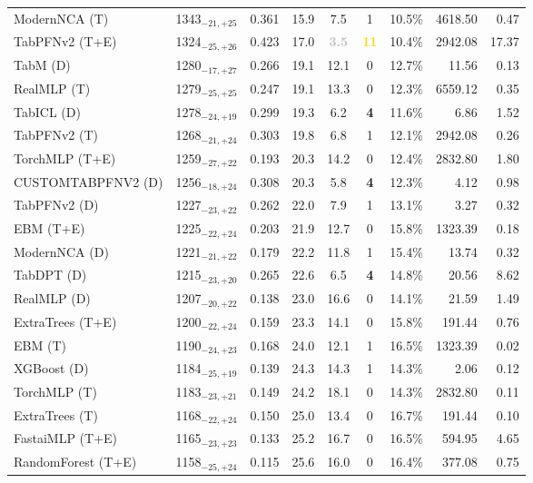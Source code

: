 \begin{tabular}{llcccccrr}
ModernNCA (T) & 1343${}_{-21,+25}$ & 0.361 & 15.9 & 7.5 & 1 & 10.5\% & 4618.50 & 0.47 \\
TabPFNv2 (T+E) & 1324${}_{-25,+26}$ & 0.423 & 17.0 & \textcolor{silver}{\textbf{3.5}} & \textcolor{gold}{\textbf{11}} & 10.4\% & 2942.08 & 17.37 \\
TabM (D) & 1280${}_{-17,+27}$ & 0.266 & 19.1 & 12.1 & 0 & 12.7\% & 11.56 & 0.13 \\
RealMLP (T) & 1279${}_{-25,+25}$ & 0.247 & 19.1 & 13.3 & 0 & 12.3\% & 6559.12 & 0.35 \\
TabICL (D) & 1278${}_{-24,+19}$ & 0.299 & 19.3 & 6.2 & \textcolor{bronze}{\textbf{4}} & 11.6\% & 6.86 & 1.52 \\
TabPFNv2 (T) & 1268${}_{-21,+24}$ & 0.303 & 19.8 & 6.8 & 1 & 12.1\% & 2942.08 & 0.26 \\
TorchMLP (T+E) & 1259${}_{-27,+22}$ & 0.193 & 20.3 & 14.2 & 0 & 12.4\% & 2832.80 & 1.80 \\
CUSTOMTABPFNV2 (D) & 1256${}_{-18,+24}$ & 0.308 & 20.3 & 5.8 & \textcolor{bronze}{\textbf{4}} & 12.3\% & 4.12 & 0.98 \\
TabPFNv2 (D) & 1227${}_{-23,+22}$ & 0.262 & 22.0 & 7.9 & 1 & 13.1\% & 3.27 & 0.32 \\
EBM (T+E) & 1225${}_{-22,+24}$ & 0.203 & 21.9 & 12.7 & 0 & 15.8\% & 1323.39 & 0.18 \\
ModernNCA (D) & 1221${}_{-21,+22}$ & 0.179 & 22.2 & 11.8 & 1 & 15.4\% & 13.74 & 0.32 \\
TabDPT (D) & 1215${}_{-23,+20}$ & 0.265 & 22.6 & 6.5 & \textcolor{bronze}{\textbf{4}} & 14.8\% & 20.56 & 8.62 \\
RealMLP (D) & 1207${}_{-20,+22}$ & 0.138 & 23.0 & 16.6 & 0 & 14.1\% & 21.59 & 1.49 \\
ExtraTrees (T+E) & 1200${}_{-22,+24}$ & 0.159 & 23.3 & 14.1 & 0 & 15.8\% & 191.44 & 0.76 \\
EBM (T) & 1190${}_{-24,+23}$ & 0.168 & 24.0 & 12.1 & 1 & 16.5\% & 1323.39 & 0.02 \\
XGBoost (D) & 1184${}_{-25,+19}$ & 0.139 & 24.3 & 14.3 & 1 & 14.3\% & 2.06 & 0.12 \\
TorchMLP (T) & 1183${}_{-23,+21}$ & 0.149 & 24.2 & 18.1 & 0 & 14.3\% & 2832.80 & 0.11 \\
ExtraTrees (T) & 1168${}_{-22,+24}$ & 0.150 & 25.0 & 13.4 & 0 & 16.7\% & 191.44 & 0.10 \\
FastaiMLP (T+E) & 1165${}_{-23,+23}$ & 0.133 & 25.2 & 16.7 & 0 & 16.5\% & 594.95 & 4.65 \\
RandomForest (T+E) & 1158${}_{-25,+24}$ & 0.115 & 25.6 & 16.0 & 0 & 16.4\% & 377.08 & 0.75 \\

\end{tabular}
